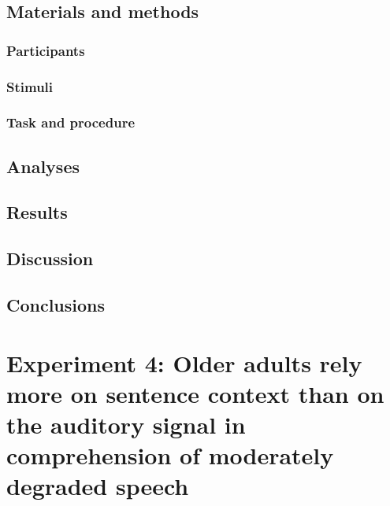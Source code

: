 \documentclass[a4paper, nobind]{templates/ociamthesis}
\begin{document}
\hypertarget{materials-and-methods-3}{%
\section{Materials and methods}\label{materials-and-methods-3}}

\hypertarget{participants-3}{%
\subsection{Participants}\label{participants-3}}

\hypertarget{stimuli-3}{%
\subsection{Stimuli}\label{stimuli-3}}

\hypertarget{task-and-procedure-3}{%
\subsection{Task and procedure}\label{task-and-procedure-3}}

\hypertarget{analyses-3}{%
\section{Analyses}\label{analyses-3}}

\hypertarget{results-3}{%
\section{Results}\label{results-3}}

\hypertarget{discussion-2}{%
\section{Discussion}\label{discussion-2}}

\hypertarget{conclusions-1}{%
\section{Conclusions}\label{conclusions-1}}

\hypertarget{experiment-4-older-adults-rely-more-on-sentence-context-than-on-the-auditory-signal-in-comprehension-of-moderately-degraded-speech}{%
\chapter{Experiment 4: Older adults rely more on sentence context than on the auditory signal in comprehension of moderately degraded speech}\label{experiment-4-older-adults-rely-more-on-sentence-context-than-on-the-auditory-signal-in-comprehension-of-moderately-degraded-speech}}
\end{document}
